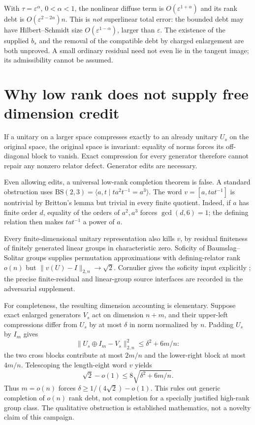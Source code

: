 \documentclass[11pt]{article}
\newcommand{\eps}{\varepsilon}
\begin{document}
With $\tau=\eps^\alpha$, $0<\alpha<1$, the nonlinear diffuse term is $O(\eps^{1+\alpha})$ and its rank debt is $O(\eps^{2-2\alpha})n$. This is \emph{not} superlinear total error: the bounded debt may have Hilbert--Schmidt size $O(\eps^{1-\alpha})$, larger than $\eps$. The existence of the supplied $b_s$ and the removal of the compatible debt by charged enlargement are both unproved. A small ordinary residual need not even lie in the tangent image; its admissibility cannot be assumed.

\section{Why low rank does not supply free dimension credit}
If a unitary on a larger space compresses exactly to an already unitary $U_s$ on the original space, the original space is invariant: equality of norms forces its off-diagonal block to vanish. Exact compression for every generator therefore cannot repair any nonzero relator defect. Generator edits are necessary.

Even allowing edits, a universal low-rank completion theorem is false. A standard obstruction uses $\mathrm{BS}(2,3)=\langle a,t\mid ta^2t^{-1}=a^3\rangle$. The word $v=[a,tat^{-1}]$ is nontrivial by Britton's lemma but trivial in every finite quotient. Indeed, if $a$ has finite order $d$, equality of the orders of $a^2,a^3$ forces $\gcd(d,6)=1$; the defining relation then makes $tat^{-1}$ a power of $a$.

Every finite-dimensional unitary representation also kills $v$, by residual finiteness of finitely generated linear groups in characteristic zero. Soficity of Baumslag--Solitar groups supplies permutation approximations with defining-relator rank $o(n)$ but $\|v(U)-I\|_{2,n}\to\sqrt2$. Cornulier gives the soficity input explicitly \cite{Cornulier}; the precise finite-residual and linear-group source interfaces are recorded in the adversarial supplement.

For completeness, the resulting dimension accounting is elementary. Suppose exact enlarged generators $V_s$ act on dimension $n+m$, and their upper-left compressions differ from $U_s$ by at most $\delta$ in norm normalized by $n$. Padding $U_s$ by $I_m$ gives
\[
\|U_s\oplus I_m-V_s\|_{2,n}^2\leq\delta^2+6m/n:
\]
the two cross blocks contribute at most $2m/n$ and the lower-right block at most $4m/n$. Telescoping the length-eight word $v$ yields
\[
\sqrt2-o(1)\leq8\sqrt{\delta^2+6m/n}.
\]
Thus $m=o(n)$ forces $\delta\geq1/(4\sqrt2)-o(1)$. This rules out generic completion of $o(n)$ rank debt, not completion for a specially justified high-rank group class. The qualitative obstruction is established mathematics, not a novelty claim of this campaign.
\end{document}
